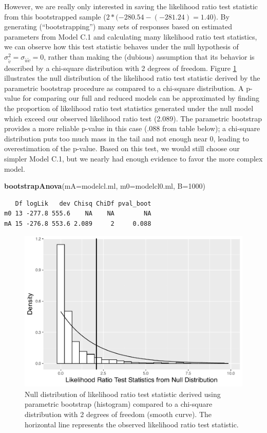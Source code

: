 \documentclass[
]{krantz}
\newenvironment{Shaded}{\begin{snugshade}}{\end{snugshade}}
\newcommand{\DataTypeTok}[1]{\textcolor[rgb]{0.27,0.27,0.27}{#1}}
\newcommand{\DecValTok}[1]{\textcolor[rgb]{0.06,0.06,0.06}{#1}}
\newcommand{\KeywordTok}[1]{\textcolor[rgb]{0.27,0.27,0.27}{\textbf{#1}}}
\newcommand{\NormalTok}[1]{#1}
\begin{document}
However, we are really only interested in saving the likelihood ratio test statistic from this bootstrapped sample (\(2*(-280.54 - (-281.24) = 1.40\)). By generating (``bootstrapping'') many sets of responses based on estimated parameters from Model C.1 and calculating many likelihood ratio test statistics, we can observe how this test statistic behaves under the null hypothesis of \(\sigma_{\tilde{v}}^{2} = \sigma_{\tilde{u}\tilde{v}} = 0\), rather than making the (dubious) assumption that its behavior is described by a chi-square distribution with 2 degrees of freedom. Figure \ref{fig:paraboot10} illustrates the null distribution of the likelihood ratio test statistic derived by the parametric bootstrap procedure as compared to a chi-square distribution. A p-value for comparing our full and reduced models can be approximated by finding the proportion of likelihood ratio test statistics generated under the null model which exceed our observed likelihood ratio test (2.089). The parametric bootstrap provides a more reliable p-value in this case (.088 from table below); a chi-square distribution puts too much mass in the tail and not enough near 0, leading to overestimation of the p-value. Based on this test, we would still choose our simpler Model C.1, but we nearly had enough evidence to favor the more complex model.

\begin{Shaded}
\begin{Highlighting}[]
\KeywordTok{bootstrapAnova}\NormalTok{(}\DataTypeTok{mA=}\NormalTok{modelcl.ml, }\DataTypeTok{m0=}\NormalTok{modelcl0.ml, }\DataTypeTok{B=}\DecValTok{1000}\NormalTok{)}
\end{Highlighting}
\end{Shaded}

\begin{verbatim}
   Df logLik   dev Chisq ChiDf pval_boot
m0 13 -277.8 555.6    NA    NA        NA
mA 15 -276.8 553.6 2.089     2     0.088
\end{verbatim}

\begin{figure}

{\centering \includegraphics[width=0.6\linewidth]{bookdown-BeyondMLR_files/figure-latex/paraboot10-1} 

}

\caption{Null distribution of likelihood ratio test statistic derived using parametric bootstrap (histogram) compared to a chi-square distribution with 2 degrees of freedom (smooth curve).  The horizontal line represents the observed likelihood ratio test statistic.}\label{fig:paraboot10}
\end{figure}
\end{document}

